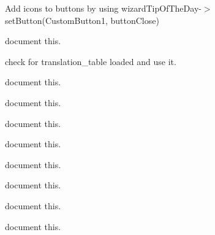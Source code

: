 \begin{DoxyRefList}
\label{todo__todo000032}%
%
Add icons to buttons by using wizard\+Tip\+Of\+The\+Day-\/\texorpdfstring{$>$}{>}set\+Button(\+Custom\+Button1, button\+Close)  
\item[Member \mbox{\hyperlink{imgui__main_8c_ade3b9b5707149bbc7ebd77108a593cf3}{Tip\+Of\+The\+Day}} (void)]\label{todo__todo000184}%
%
document this.  
\item[Member \mbox{\hyperlink{imgui__main_8c_a84be33a7d31671fab1c88149df77a831}{translate}} (const char $\ast$string)]\label{todo__todo000078}%
%
check for translation\+\_\+table loaded and use it.  
\item[Member \mbox{\hyperlink{imgui__main_8c_adacf9e6c84ab5ba4079ab046784ad773}{triangle\+\_\+action}} (void)]\label{todo__todo000117}%
%
document this.  
\item[Member \mbox{\hyperlink{imgui__main_8c_ac2add86e93e670809a0836fef462d7b8}{undo\+\_\+action}} (void)]\label{todo__todo000118}%
%
document this.  
\item[Member \mbox{\hyperlink{imgui__main_8c_ad2b4c954bfa0e509c24c6da87532e771}{undo\+\_\+history\+\_\+viewer}} (void)]\label{todo__todo000010}%
%
document this.  
\item[Member \mbox{\hyperlink{imgui__main_8c_ade55590a3b7e8da115c7b1040da0a26e}{undo\+\_\+navigation}} (void)]\label{todo__todo000207}%
%
document this.  
\item[Member \mbox{\hyperlink{imgui__main_8c_a459ace9a6c614fe41b7f08ba91bc6dd4}{Undo\+History}} ]\label{todo__todo000002}%
%
document this.  
\item[Member \mbox{\hyperlink{imgui__main_8c_a4f0db1805b61395ac5131b6715853664}{update\+\_\+menu\+\_\+toolbar\+\_\+statusbar}} (void)]\label{todo__todo000203}%
%
document this.  
\item[Member \mbox{\hyperlink{imgui__main_8c_a0e5edf9912d0ddf2001d8b2dee57160f}{update\+All\+View\+Cross\+Hair\+Colors}} (unsigned int color)]\label{todo__todo000168}%
%
document this.  
\item[Member \mbox{\hyperlink{imgui__main_8c_a2d7aab5bd0ea8c76fa3632031226a84e}{update\+All\+View\+Grid\+Colors}} (unsigned int color)]\label{todo__todo000170}%
%
document this.  
\item[Member \mbox{\hyperlink{imgui__main_8c_aca4bc88b2a23d898c399d9b8cac93633}{update\+All\+Viewscrollbars}} (bool val)]\label{todo__todo000167}%

\end{DoxyRefList}
